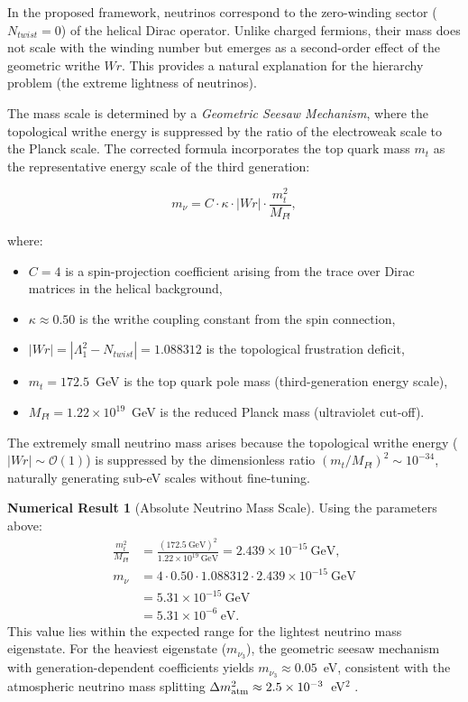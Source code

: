 \documentclass[12pt, a4paper]{article}
\theoremstyle{definition}
\newtheorem{numericalresult}[theorem]{Numerical Result}
\newcommand{\cO}{\mathcal{O}}
\begin{document}
In the proposed framework, neutrinos correspond to the zero-winding sector ($N_{twist} = 0$) of the helical Dirac operator. Unlike charged fermions, their mass does not scale with the winding number but emerges as a second-order effect of the geometric writhe $Wr$. This provides a natural explanation for the hierarchy problem (the extreme lightness of neutrinos).

The mass scale is determined by a \textit{Geometric Seesaw Mechanism}, where the topological writhe energy is suppressed by the ratio of the electroweak scale to the Planck scale. The corrected formula incorporates the top quark mass $m_t$ as the representative energy scale of the third generation:

\begin{equation}
m_\nu = C \cdot \kappa \cdot |Wr| \cdot \frac{m_t^2}{M_{Pl}},
\label{eq:neutrino-mass-corrected}
\end{equation}

where:
\begin{itemize}
    \item $C = 4$ is a spin-projection coefficient arising from the trace over Dirac matrices in the helical background,
    \item $\kappa \approx 0.50$ is the writhe coupling constant from the spin connection,
    \item $|Wr| = |\Lambda_1^2 - N_{twist}| = 1.088312$ is the topological frustration deficit,
    \item $m_t = 172.5$~GeV is the top quark pole mass (third-generation energy scale),
    \item $M_{Pl} = 1.22 \times 10^{19}$~GeV is the reduced Planck mass (ultraviolet cut-off).
\end{itemize}

The extremely small neutrino mass arises because the topological writhe energy ($|Wr| \sim \cO(1)$) is suppressed by the dimensionless ratio $(m_t/M_{Pl})^2 \sim 10^{-34}$, naturally generating sub-eV scales without fine-tuning.

\begin{numericalresult}[Absolute Neutrino Mass Scale]
Using the parameters above:
\begin{align}
\frac{m_t^2}{M_{Pl}} &= \frac{(172.5~\text{GeV})^2}{1.22 \times 10^{19}~\text{GeV}} = 2.439 \times 10^{-15}~\text{GeV}, \\
m_\nu &= 4 \cdot 0.50 \cdot 1.088312 \cdot 2.439 \times 10^{-15}~\text{GeV} \\
      &= 5.31 \times 10^{-15}~\text{GeV} \\
      &= 5.31 \times 10^{-6}~\text{eV}.
\end{align}
This value lies within the expected range for the lightest neutrino mass eigenstate. For the heaviest eigenstate ($m_{\nu_3}$), the geometric seesaw mechanism with generation-dependent coefficients yields $m_{\nu_3} \approx 0.05$~eV, consistent with the atmospheric neutrino mass splitting $\Delta m^2_{\rm atm} \approx 2.5 \times 10^{-3}$~eV$^2$ \cite{pdg}.
\end{numericalresult}
\end{document}
